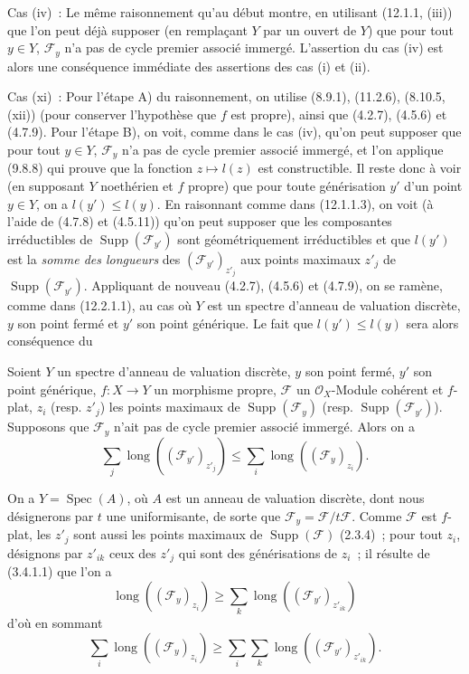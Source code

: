 \begin{env}[12.2.1.2]
\label{IV.12.2.1.2-fr}
Cas (iv)~: Le même raisonnement qu'au début montre, en utilisant (12.1.1,
(iii)) que l'on peut déjà supposer (en remplaçant $Y$ par un ouvert de $Y$) que
pour tout $y\in Y$, $\mathcal F_y$ n'a pas de cycle premier associé immergé.
L'assertion du cas (iv) est alors une conséquence immédiate des assertions des
cas (i) et (ii).
\end{env}

\begin{env}[12.2.1.3]
\label{IV.12.2.1.3-fr}
Cas (xi)~: Pour l'étape A) du raisonnement, on utilise (8.9.1), (11.2.6),
(8.10.5, (xii)) (pour conserver l'hypothèse que $f$ est propre), ainsi que
(4.2.7), (4.5.6) et (4.7.9). Pour l'étape B), on voit, comme dans le cas (iv),
qu'on peut supposer que pour tout $y\in Y$, $\mathcal F_y$ n'a pas de cycle
premier associé immergé, et l'on applique (9.8.8) qui prouve que la fonction
$z\mapsto l(z)$ est constructible. Il reste donc à voir (en supposant $Y$
noethérien et $f$ propre) que pour toute générisation $y'$ d'un point $y\in Y$,
on a $l(y')\leq l(y)$. En raisonnant comme dans (12.1.1.3), on voit (à l'aide
de (4.7.8) et (4.5.11)) qu'on peut supposer que les composantes irréductibles
de $\operatorname{Supp}(\mathcal F_{y'})$ sont géométriquement irréductibles
et que $l(y')$ est la \emph{somme des longueurs} des
$(\mathcal F_{y'})_{z'_j}$ aux points maximaux $z'_j$ de
$\operatorname{Supp}(\mathcal F_{y'})$. Appliquant de nouveau (4.2.7), (4.5.6)
et (4.7.9), on se ramène, comme dans (12.2.1.1), au cas où $Y$ est un spectre
d'anneau de valuation discrète, $y$ son point fermé et $y'$ son point générique.
Le fait que $l(y')\leq l(y)$ sera alors conséquence du

\begin{lemma}[12.2.1.4]
\label{IV.12.2.1.4-fr}
Soient $Y$ un spectre d'anneau de valuation discrète, $y$ son point fermé,
$y'$ son point générique, $f:X\to Y$ un morphisme propre, $\mathcal F$ un
$\mathcal O_X$-Module cohérent et $f$-plat, $z_i$ (resp. $z'_j$) les points
maximaux de $\operatorname{Supp}(\mathcal F_y)$ (resp.
$\operatorname{Supp}(\mathcal F_{y'})$). Supposons que $\mathcal F_y$ n'ait
pas de cycle premier associé immergé. Alors on a
\[
  \sum_j\operatorname{long}((\mathcal F_{y'})_{z'_j})
  \leq\sum_i\operatorname{long}((\mathcal F_y)_{z_i}).
\]
\end{lemma}

On a $Y=\operatorname{Spec}(A)$, où $A$ est un anneau de valuation discrète,
dont nous désignerons par $t$ une uniformisante, de sorte que
$\mathcal F_y=\mathcal F/t\mathcal F$. Comme $\mathcal F$ est $f$-plat, les
$z'_j$ sont aussi les points maximaux de $\operatorname{Supp}(\mathcal F)$
(2.3.4)~; pour tout $z_i$, désignons par $z'_{ik}$ ceux des $z'_j$ qui sont des
générisations de $z_i$~; il résulte de (3.4.1.1) que l'on a
\[
  \operatorname{long}((\mathcal F_y)_{z_i})
  \geq\sum_k\operatorname{long}((\mathcal F_{y'})_{z'_{ik}})
\]
d'où en sommant
\[
  \sum_i\operatorname{long}((\mathcal F_y)_{z_i})
  \geq\sum_i\sum_k\operatorname{long}((\mathcal F_{y'})_{z'_{ik}}).
\]


\end{env}
